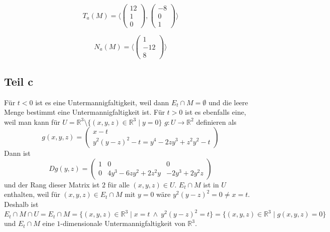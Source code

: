 \documentclass[10pt,a4paper]{article}
\begin{document}
\begin{equation}
  T_{a}(M) = \langle
  \begin{pmatrix}
    12\\1\\0
  \end{pmatrix},
  \begin{pmatrix}
    -8\\0\\1
  \end{pmatrix}
  \rangle
\end{equation}

\begin{equation}
  N_{a}(M) = \langle
  \begin{pmatrix}
    1\\-12\\8
  \end{pmatrix}
  \rangle
\end{equation}

\subsection{Teil c}

Für $t < 0$ ist es eine Untermannigfaltigkeit, weil dann $E_{t} \cap M = \emptyset$ und die leere Menge bestimmt eine Untermannigfaltigkeit ist.
Für $t > 0$ ist es ebenfalls eine, weil man kann für $U = \mathbb{R}^{3} \setminus \{ (x, y, z) \in \mathbb{R}^{3} \mid y = 0 \}$ $g : U \rightarrow \mathbb{R}^{2}$ definieren als
\begin{equation}
  g(x, y, z) = \begin{pmatrix}
    x - t\\
    y^{2}(y - z)^{2} - t = y^{4} - 2zy^{3} + z^{2}y^{2} - t
  \end{pmatrix}
\end{equation}
Dann ist
\begin{equation}
  Dg(y, z) = \begin{pmatrix}
    1 & 0 & 0\\
    0 & 4y^{3} - 6zy^{2} + 2z^{2}y & -2y^{3} + 2y^{2}z
  \end{pmatrix}
\end{equation}
und der Rang dieser Matrix ist $2$ für alle $(x, y, z) \in U$.
$E_{t} \cap M$ ist in $U$ enthalten, weil für $(x, y, z) \in E_{t} \cap M$ mit $y = 0$ wäre $y^{2}(y - z)^{2} = 0 \ne x = t$.
Deshalb ist
\begin{equation}
  E_{t} \cap M \cap U = E_{t} \cap M = \{ (x, y, z) \in \mathbb{R}^{3} \mid x = t\ \land\ y^{2}(y - z)^{2} = t \} = \{ (x, y, z) \in \mathbb{R}^{3} \mid g(x, y, z) = 0 \}
\end{equation}
und $E_{t} \cap M$ eine $1$-dimensionale Untermannigfaltigkeit von $\mathbb{R}^{3}$.
\end{document}
